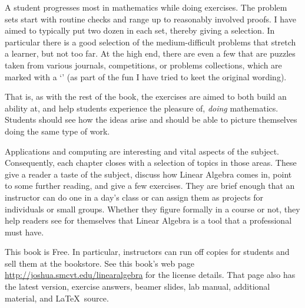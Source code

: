 {%

A student progresses most in mathematics while doing exercises. 
The problem sets start with 
routine checks and range up to reasonably involved proofs.
I have aimed to typically put two dozen in each set, 
thereby giving a selection.
In particular there is a good selection of the medium-difficult problems
that stretch a learner, but not too far.
At the high end, there are even a few that are puzzles
taken from various journals, competitions, or
problems collections, which  
are marked with a
`\puzzlemark'  
(as part of the fun I have tried to keet the original wording).

That is, as with the rest of the book, 
the exercises are aimed to both build an ability at,
and help students experience the pleasure of, 
\emph{doing} mathematics.
Students should see how the ideas arise and should be able to 
picture themselves doing the same type of work.


\medskip
{}
Applications and computing are interesting and vital aspects 
of the subject.
Consequently, each chapter closes with a selection of
topics in those areas.
These give a reader
a taste of the subject, discuss how Linear Algebra comes in,
point to some further reading, and give a few exercises. 
They are brief enough that an instructor can do one
in a day's class 
or can assign them as projects for individuals or small groups.
Whether they figure formally in a course or not, they help
readers see for themselves that Linear Algebra is a tool
that a professional must have. 




\medskip
{}
This book is Free.
In particular, instructors can run off copies for students 
and sell them at the bookstore.
See this book's web page 
\url{http://joshua.smcvt.edu/linearalgebra}
for the license details.
That page also has the latest version, 
exercise answers, beamer slides, lab manual, additional material,
and \LaTeX\ source.



}
